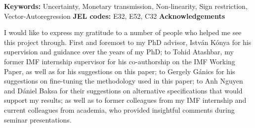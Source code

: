 \noindent \textbf{Keywords:} Uncertainty, Monetary transmission, Non-linearity, Sign restriction, Vector-Autoregression \linebreak
\noindent \textbf{JEL codes:} E32, E52, C32 
\newpage
\bgroup
\large{\textbf{Acknowledgements}}\\
\egroup

I would like to express my gratitude to a number of people who helped me see this project through. First and foremost to my PhD advisor, István Kónya for his supervision and guidance over the years of my PhD; to Tohid Atashbar, my former IMF internship supervisor for his co-authorship on the IMF Working Paper, as well as for his suggestions on this paper; to Gergely Gánics for his suggestions on fine-tuning the methodology used in this paper; to Anh Nguyen and Dániel Baksa for their suggestions on alternative specifications that would support my results; as well as to former colleagues from my IMF internship and current colleagues from academia, who provided insightful comments during seminar presentations.

\newpage 
\bgroup
\hypersetup{linkcolor = black}
\renewcommand{\baselinestretch}{1}\normalsize
\tableofcontents
\newpage
\listoffigures
\egroup
\newpage
